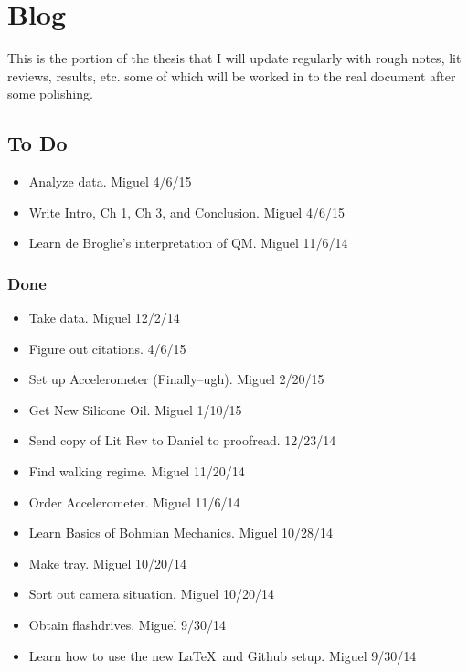 \chapter*{Blog}
	
	This is the portion of the thesis that I will update regularly with rough notes, lit reviews, results, etc. some of which will be worked in to the real document after some polishing. 

	
	
	\section{To Do}
	\begin{itemize}
	\item{Analyze data. Miguel 4/6/15}
	\item{Write Intro, Ch 1, Ch 3, and Conclusion. Miguel 4/6/15}
     \item{Learn de Broglie's interpretation of QM. Miguel 11/6/14}
	\end{itemize}
	
	\subsection{Done}
	\begin{itemize}
	 \item{Take data. Miguel 12/2/14}
        \item{Figure out citations. 4/6/15}
	 \item{Set up Accelerometer (Finally--ugh). Miguel 
 2/20/15}
     \item{Get New Silicone Oil. Miguel 1/10/15}
     \item{Send copy of Lit Rev to Daniel to proofread. 12/23/14}
	\item{Find walking regime. Miguel 11/20/14}
	\item{Order Accelerometer. Miguel 11/6/14}
	\item{Learn Basics of Bohmian Mechanics. Miguel 10/28/14}
	\item{Make tray. Miguel 10/20/14}
	\item{Sort out camera situation. Miguel 10/20/14}
	\item{Obtain flashdrives.    Miguel 9/30/14}
	\item{Learn how to use the new \LaTeX\ and Github setup. Miguel 9/30/14}
	\end{itemize}
	

